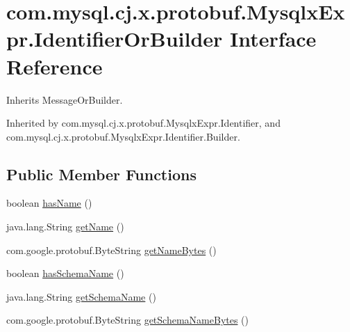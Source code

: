 \hypertarget{interfacecom_1_1mysql_1_1cj_1_1x_1_1protobuf_1_1_mysqlx_expr_1_1_identifier_or_builder}{}\section{com.\+mysql.\+cj.\+x.\+protobuf.\+Mysqlx\+Expr.\+Identifier\+Or\+Builder Interface Reference}
\label{interfacecom_1_1mysql_1_1cj_1_1x_1_1protobuf_1_1_mysqlx_expr_1_1_identifier_or_builder}


Inherits Message\+Or\+Builder.



Inherited by com.\+mysql.\+cj.\+x.\+protobuf.\+Mysqlx\+Expr.\+Identifier, and com.\+mysql.\+cj.\+x.\+protobuf.\+Mysqlx\+Expr.\+Identifier.\+Builder.

\subsection*{Public Member Functions}
\begin{DoxyCompactItemize}
\item 
boolean \mbox{\hyperlink{interfacecom_1_1mysql_1_1cj_1_1x_1_1protobuf_1_1_mysqlx_expr_1_1_identifier_or_builder_a38274e571d6f926158e76ffc66d1261c}{has\+Name}} ()
\item 
java.\+lang.\+String \mbox{\hyperlink{interfacecom_1_1mysql_1_1cj_1_1x_1_1protobuf_1_1_mysqlx_expr_1_1_identifier_or_builder_a52f59d52ea5bd05d35bab35da97893bc}{get\+Name}} ()
\item 
com.\+google.\+protobuf.\+Byte\+String \mbox{\hyperlink{interfacecom_1_1mysql_1_1cj_1_1x_1_1protobuf_1_1_mysqlx_expr_1_1_identifier_or_builder_a8ae30067cce90289127f4800d1ef1328}{get\+Name\+Bytes}} ()
\item 
boolean \mbox{\hyperlink{interfacecom_1_1mysql_1_1cj_1_1x_1_1protobuf_1_1_mysqlx_expr_1_1_identifier_or_builder_a9e9c45e442fc9365434be0e66de5f0d8}{has\+Schema\+Name}} ()
\item 
java.\+lang.\+String \mbox{\hyperlink{interfacecom_1_1mysql_1_1cj_1_1x_1_1protobuf_1_1_mysqlx_expr_1_1_identifier_or_builder_af57120f9a084f477d0801b7e18615fc8}{get\+Schema\+Name}} ()
\item 
com.\+google.\+protobuf.\+Byte\+String \mbox{\hyperlink{interfacecom_1_1mysql_1_1cj_1_1x_1_1protobuf_1_1_mysqlx_expr_1_1_identifier_or_builder_a166f0654f6da871d2090b73b2418a981}{get\+Schema\+Name\+Bytes}} ()
\end{DoxyCompactItemize}


